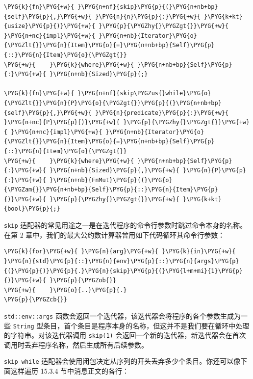 \begin{Verbatim}[commandchars=\\\{\},breaklines=true,breakanywhere=true,fontsize=\codefont,xleftmargin=17bp]
\PYG{k}{fn}\PYG{+w}{ }\PYG{n+nf}{skip}\PYG{p}{(}\PYG{n+nb+bp}{self}\PYG{p}{,}\PYG{+w}{ }\PYG{n}{n}\PYG{p}{:}\PYG{+w}{ }\PYG{k+kt}{usize}\PYG{p}{)}\PYG{+w}{ }\PYG{p}{\PYGZhy{}\PYGZgt{}}\PYG{+w}{ }\PYG{n+nc}{impl}\PYG{+w}{ }\PYG{n+nb}{Iterator}\PYG{o}{\PYGZlt{}}\PYG{n}{Item}\PYG{o}{=}\PYG{n+nb+bp}{Self}\PYG{p}{::}\PYG{n}{Item}\PYG{o}{\PYGZgt{}}
\PYG{+w}{    }\PYG{k}{where}\PYG{+w}{ }\PYG{n+nb+bp}{Self}\PYG{p}{:}\PYG{+w}{ }\PYG{n+nb}{Sized}\PYG{p}{;}

\PYG{k}{fn}\PYG{+w}{ }\PYG{n+nf}{skip\PYGZus{}while}\PYG{o}{\PYGZlt{}}\PYG{n}{P}\PYG{o}{\PYGZgt{}}\PYG{p}{(}\PYG{n+nb+bp}{self}\PYG{p}{,}\PYG{+w}{ }\PYG{n}{predicate}\PYG{p}{:}\PYG{+w}{ }\PYG{n+nc}{P}\PYG{p}{)}\PYG{+w}{ }\PYG{p}{\PYGZhy{}\PYGZgt{}}\PYG{+w}{ }\PYG{n+nc}{impl}\PYG{+w}{ }\PYG{n+nb}{Iterator}\PYG{o}{\PYGZlt{}}\PYG{n}{Item}\PYG{o}{=}\PYG{n+nb+bp}{Self}\PYG{p}{::}\PYG{n}{Item}\PYG{o}{\PYGZgt{}}
\PYG{+w}{    }\PYG{k}{where}\PYG{+w}{ }\PYG{n+nb+bp}{Self}\PYG{p}{:}\PYG{+w}{ }\PYG{n+nb}{Sized}\PYG{p}{,}\PYG{+w}{ }\PYG{n}{P}\PYG{p}{:}\PYG{+w}{ }\PYG{n+nb}{FnMut}\PYG{p}{(}\PYG{o}{\PYGZam{}}\PYG{n+nb+bp}{Self}\PYG{p}{::}\PYG{n}{Item}\PYG{p}{)}\PYG{+w}{ }\PYG{p}{\PYGZhy{}\PYGZgt{}}\PYG{+w}{ }\PYG{k+kt}{bool}\PYG{p}{;}
\end{Verbatim}

\texttt{skip} 适配器的常见用途之一是在迭代程序的命令行参数时跳过命令本身的名称。在第 2 章中，我们的最大公约数计算器曾用如下代码循环其命令行参数：

\begin{Verbatim}[commandchars=\\\{\},breaklines=true,breakanywhere=true,fontsize=\codefont,xleftmargin=17bp]
\PYG{k}{for}\PYG{+w}{ }\PYG{n}{arg}\PYG{+w}{ }\PYG{k}{in}\PYG{+w}{ }\PYG{n}{std}\PYG{p}{::}\PYG{n}{env}\PYG{p}{::}\PYG{n}{args}\PYG{p}{(}\PYG{p}{)}\PYG{p}{.}\PYG{n}{skip}\PYG{p}{(}\PYG{l+m+mi}{1}\PYG{p}{)}\PYG{+w}{ }\PYG{p}{\PYGZob{}}
\PYG{+w}{    }\PYG{o}{..}\PYG{p}{.}
\PYG{p}{\PYGZcb{}}
\end{Verbatim}

\texttt{std::env::args} 函数会返回一个迭代器，该迭代器会将程序的各个参数生成为一些 \texttt{String} 型条目，首个条目是程序本身的名称，但这并不是我们要在循环中处理的字符串。对该迭代器调用 \texttt{skip(1)} 会返回一个新的迭代器，新迭代器会在首次调用时丢弃程序名称，然后生成所有后续参数。

\texttt{skip\_while} 适配器会使用闭包决定从序列的开头丢弃多少个条目。你还可以像下面这样遍历 15.3.4 节中消息正文的各行：

